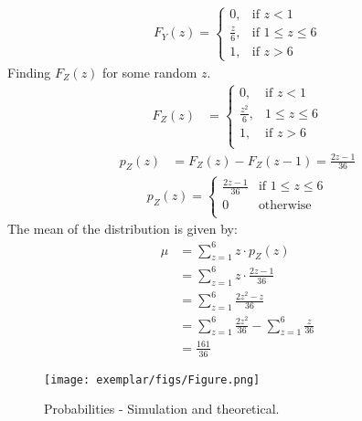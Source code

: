 \documentclass[journal,12pt,twocolumn]{IEEEtran}
\begin{document}
\begin{align}
F_Y(z) = \begin{cases}
  0, & \text{if } z < 1 \\
  \frac{z}{6}, & \text{if } 1 \leq z \leq 6 \\
  1, & \text{if } z > 6
\end{cases}
\end{align}
Finding $F_Z(z)$ for some random $z$.
\begin{align}
F_Z(z) &=
    \begin{cases}
     0, & \text{if } z < 1 \\
    \frac{z^2}{6}, & 1 \leq z \leq 6\\
     1, & \text{if } z > 6 \\
    \end{cases}
\end{align}
\begin{align}
p_Z(z) &= F_Z(z) - F_Z(z-1) = \frac{2z-1}{36} 
\end{align}
\begin{align}
p_Z(z) = \begin{cases} 
       \frac{2z-1}{36} & \text{if } 1 \leq z \leq 6 \\
        0 & \text{otherwise} \\
         \end{cases}
\end{align}
The mean of the distribution is given by:
\begin{align}
\mu &= \sum_{z=1}^{6} z \cdot p_Z(z) \\
&= \sum_{z=1}^{6} z \cdot \frac{2z-1}{36} \\
&= \sum_{z=1}^{6} \frac{2z^2-z}{36} \\
&= \sum_{z=1}^{6} \frac{2z^2}{36} - \sum_{z=1}^{6} \frac{z}{36} \\ 
&= \frac{161}{36}
\end{align}
\begin{figure}[ht]
\centering
\texttt{[image: exemplar/figs/Figure.png]}
\caption{Probabilities - Simulation and theoretical.}
\label{fig:exemplar.12.13.3.35}
\end{figure}
\end{document}
